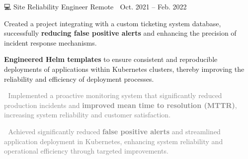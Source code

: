 \documentclass[11pt, a4paper]{awesome-cv}
\newcommand{\hll}[1]{\noindent\colorbox{light-gray}{\parbox{18cm}{\textcolor{gray}{#1}}}}
\begin{document}
{\begin{cventries}
		{💻 Site Reliability Engineer} %
		{Remote 📍} %
		{Oct. 2021 – Feb. 2022 📆} %
		{\begin{cvitems}
				\item {Created a project integrating with a custom ticketing system database, successfully
				            \textbf{reducing false positive alerts} and enhancing the precision of incident response
				            mechanisms.}
				\item {\textbf{Engineered Helm templates} to ensure consistent and reproducible deployments
				            of applications within Kubernetes clusters, thereby improving the reliability and
				            efficiency of deployment processes.}
				\\
				\newline
				\hll{🎯 Implemented a proactive monitoring system that significantly reduced production
					incidents and \textbf{improved mean time to resolution (MTTR)}, increasing system
					reliability and customer satisfaction.}
				\hll{🎯 Achieved significantly reduced \textbf{false positive alerts} and streamlined
					application deployment in Kubernetes, enhancing system reliability and operational
					efficiency through targeted improvements.}
			\end{cvitems}
		}



\end{cventries}}
\end{document}
